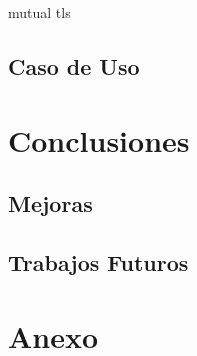 \documentclass[a4paper,11pt]{book}
\begin{document}
mutual tls

\section{Caso de Uso}

\chapter{Conclusiones}


\section{Mejoras}

\section{Trabajos Futuros}


\chapter{ Anexo}

\thispagestyle{empty}
\end{document}
